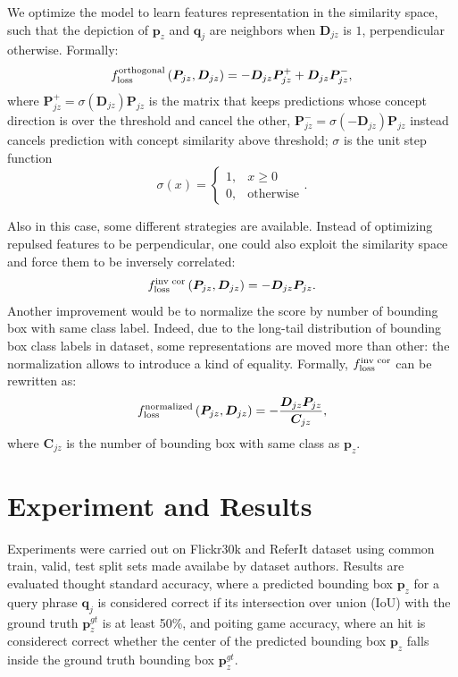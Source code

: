 \documentclass{article}
\begin{document}
We optimize the model to learn features representation in the
similarity space, such that the depiction of $\bm{p}_z$ and $\bm{q}_j$
are neighbors when $\bm{D}_{jz}$ is $1$, perpendicular otherwise.
Formally:
\begin{equation}
  f_{\text{loss}}^{\text{orthogonal}} \left( \bm{P}_{jz}, \bm{D}_{jz} \right) = - \bm{D}_{jz} \bm{P}^+_{jz} + \bm{D}_{jz} \bm{P}^-_{jz},
\end{equation}
where $\bm{P}^+_{jz} = \sigma\left( \bm{D}_{jz} \right) \bm{P}_{jz}$
is the matrix that keeps predictions whose concept direction is over
the threshold and cancel the other, $\bm{P}^-_{jz} = \sigma\left( -
\bm{D}_{jz} \right) \bm{P}_{jz}$ instead cancels prediction with
concept similarity above threshold; $\sigma$ is the unit step function
\begin{equation}
  \sigma(x) =
  \begin{cases}
    1, & x \geq 0 \\
    0, & \text{otherwise}
  \end{cases}.
\end{equation}

Also in this case, some different strategies are available. Instead of optimizing repulsed features to be perpendicular, one could also exploit the similarity space and force them to be inversely correlated:
\begin{equation}
  f_{\text{loss}}^{\text{inv cor}} \left( \bm{P}_{jz}, \bm{D}_{jz} \right) = - \bm{D}_{jz} \bm{P}_{jz}.
\end{equation}
Another improvement would be to normalize the score by number of
bounding box with same class label. Indeed, due to the long-tail
distribution of bounding box class labels in dataset, some
representations are moved more than other: the normalization allows to
introduce a kind of equality. Formally, $f_{\text{loss}}^{\text{inv cor}}$ can
be rewritten as:
\begin{equation}
  f_{\text{loss}}^{\text{normalized}} \left( \bm{P}_{jz}, \bm{D}_{jz} \right) = - \frac{\bm{D}_{jz} \bm{P}_{jz}}{\bm{C}_{jz}},
\end{equation}
where $\bm{C}_{jz}$ is the number of bounding box with same class as
$\bm{p}_z$.

\section{Experiment and Results}

Experiments were carried out on Flickr30k and ReferIt dataset using
common train, valid, test split sets made availabe by dataset authors.
Results are evaluated thought standard accuracy, where a predicted
bounding box $\bm{p}_z$ for a query phrase $\bm{q}_j$ is considered
correct if its intersection over union (IoU) with the ground truth
$\bm{p}^{gt}_z$ is at least 50\%, and poiting game accuracy, where an
hit is considerect correct whether the center of the predicted
bounding box $\bm{p}_z$ falls inside the ground truth bounding box
$\bm{p}^{gt}_z$.
\end{document}

